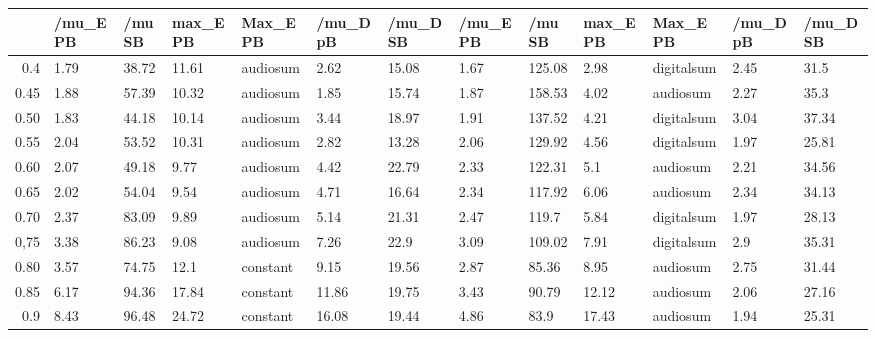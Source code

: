 \begin{table}[ht]
\centering
\begin{tabular}{rllllllllllll}
  \hline
 & /mu\_E PB & /mu SB & max\_E PB & Max\_E PB & /mu\_D pB & /mu\_D SB & /mu\_E PB & /mu SB & max\_E PB & Max\_E PB & /mu\_D pB & /mu\_D SB \\ 
  \hline
0.4 & 1.79 & 38.72 & 11.61 & audiosum & 2.62 & 15.08 & 1.67 & 125.08 & 2.98 & digitalsum & 2.45 & 31.5 \\ 
  0.45 & 1.88 & 57.39 & 10.32 & audiosum & 1.85 & 15.74 & 1.87 & 158.53 & 4.02 & audiosum & 2.27 & 35.3 \\ 
  0.50 & 1.83 & 44.18 & 10.14 & audiosum & 3.44 & 18.97 & 1.91 & 137.52 & 4.21 & digitalsum & 3.04 & 37.34 \\ 
  0.55 & 2.04 & 53.52 & 10.31 & audiosum & 2.82 & 13.28 & 2.06 & 129.92 & 4.56 & digitalsum & 1.97 & 25.81 \\ 
  0.60 & 2.07 & 49.18 & 9.77 & audiosum & 4.42 & 22.79 & 2.33 & 122.31 & 5.1 & audiosum & 2.21 & 34.56 \\ 
  0.65 & 2.02 & 54.04 & 9.54 & audiosum & 4.71 & 16.64 & 2.34 & 117.92 & 6.06 & audiosum & 2.34 & 34.13 \\ 
  0.70 & 2.37 & 83.09 & 9.89 & audiosum & 5.14 & 21.31 & 2.47 & 119.7 & 5.84 & digitalsum & 1.97 & 28.13 \\ 
  0,75 & 3.38 & 86.23 & 9.08 & audiosum & 7.26 & 22.9 & 3.09 & 109.02 & 7.91 & digitalsum & 2.9 & 35.31 \\ 
  0.80 & 3.57 & 74.75 & 12.1 & constant & 9.15 & 19.56 & 2.87 & 85.36 & 8.95 & audiosum & 2.75 & 31.44 \\ 
  0.85 & 6.17 & 94.36 & 17.84 & constant & 11.86 & 19.75 & 3.43 & 90.79 & 12.12 & audiosum & 2.06 & 27.16 \\ 
  0.9 & 8.43 & 96.48 & 24.72 & constant & 16.08 & 19.44 & 4.86 & 83.9 & 17.43 & audiosum & 1.94 & 25.31 \\ 
   \hline
\end{tabular}
\end{table}
